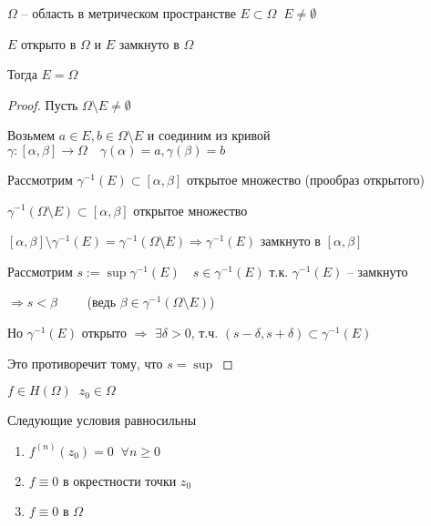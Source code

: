 
\begin{lemma}\thmslashn
	
	$\Omega$ -- область в метрическом пространстве $E \subset \Omega \;\; E \not = \emptyset$
	
	$E$ открыто в $\Omega$ и $E$ замкнуто в $\Omega$
	
	Тогда $E = \Omega$
	
\end{lemma}

\begin{proof}\thmslashn

	Пусть $\Omega \setminus E \not= \emptyset$
	
	Возьмем $a \in E, b\in \Omega \setminus E$ и соединим из кривой $\gamma:[\alpha, \beta] \to \Omega \quad \gamma(\alpha) = a, \gamma(\beta) = b$
	
	Рассмотрим $\gamma^{-1}(E) \subset [\alpha, \beta]$	открытое множество (прообраз открытого)
	
	$\gamma^{-1}(\Omega \setminus E) \subset [\alpha, \beta] $ открытое множество
	
	$[\alpha, \beta] \setminus \gamma^{-1}(E) = \gamma^{-1}(\Omega \setminus E) \Rightarrow \gamma^{-1}(E)$ замкнуто в $[\alpha, \beta]$
	
	Рассмотрим $s:= \sup \gamma^{-1}(E) \quad s \in \gamma^{-1}(E)$ т.к. $\gamma^{-1}(E)$ -- замкнуто
	
    $\Rightarrow s < \beta\qquad$ (ведь $\beta \in \gamma^{-1}(\Omega \setminus E)$)

    Но $\gamma^{-1}(E)$ открыто $\Rightarrow$ $\exists \delta > 0$, т.ч. $(s-\delta, s+ \delta) \subset \gamma^{-1}(E)$
	
	Это противоречит тому, что $s = \sup$
	
\end{proof}

\begin{theorem}[единственности]\thmslashn
	
	$f\in H(\Omega) \;\;z_0 \in \Omega$
	
	Следующие условия равносильны 
	
	\begin{enumerate}[1)]
		\item 
		$f^{(n)}(z_0) = 0 \;\; \forall n \geqslant 0$
		\item
		$f\equiv 0 $ в окрестности точки $z_0$
		\item
		$f \equiv 0$ в $\Omega$
	\end{enumerate}
	
\end{theorem}

